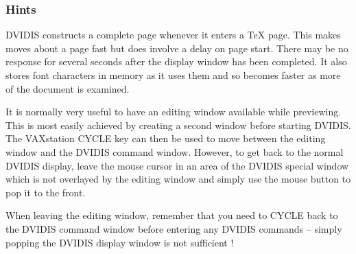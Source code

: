 \subsubsection{Hints}

DVIDIS constructs a complete page whenever it enters a \TeX\/ page.
This makes moves about a page fast but does involve a delay on page start.
There may be no response for several seconds after the display window has
been completed.
It also stores font characters in memory as it uses them and so becomes
faster as more of the document is examined.

It is normally very useful to have an editing window available while previewing.
This is most easily achieved by creating a second window before starting
DVIDIS.
The VAXstation CYCLE key can then be used to move between the editing
window and the DVIDIS command window.
However, to get back to the normal DVIDIS display, leave the mouse cursor in
an area of the DVIDIS special window which is not overlayed by the editing
window and simply use the mouse button to pop it to the front.

When leaving the editing window, remember that you need to CYCLE back to the
DVIDIS command window before entering any DVIDIS commands -- simply popping
the DVIDIS display window is not sufficient !


